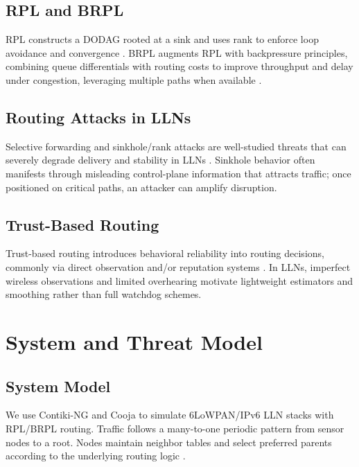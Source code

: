 \documentclass[11pt,a4paper]{article}
\begin{document}
\subsection{RPL and BRPL}
RPL constructs a DODAG rooted at a sink and uses rank to enforce loop avoidance and convergence \citep{rfc6550}. BRPL augments RPL with backpressure principles, combining queue differentials with routing costs to improve throughput and delay under congestion, leveraging multiple paths when available \citep{moeller2016brpl}.

\subsection{Routing Attacks in LLNs}
Selective forwarding and sinkhole/rank attacks are well-studied threats that can severely degrade delivery and stability in LLNs \citep{karlof2003secure,wood2002dos,le2013rank,mayzaud2016taxonomy}. Sinkhole behavior often manifests through misleading control-plane information that attracts traffic; once positioned on critical paths, an attacker can amplify disruption.

\subsection{Trust-Based Routing}
Trust-based routing introduces behavioral reliability into routing decisions, commonly via direct observation and/or reputation systems \citep{ganeriwal2004reputation,ganeriwal2008tosn,momani2010survey}. In LLNs, imperfect wireless observations and limited overhearing motivate lightweight estimators and smoothing rather than full watchdog schemes.

\section{System and Threat Model}
\label{sec:model}
\subsection{System Model}
We use Contiki-NG and Cooja to simulate 6LoWPAN/IPv6 LLN stacks with RPL/BRPL routing. Traffic follows a many-to-one periodic pattern from sensor nodes to a root. Nodes maintain neighbor tables and select preferred parents according to the underlying routing logic \citep{rfc6550,moeller2016brpl}.
\end{document}
